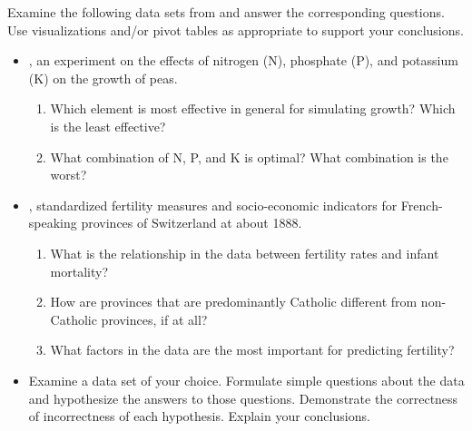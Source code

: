 \begin{problem} %
Examine the following data sets from  and answer the corresponding questions.
Use visualizations and/or pivot tables as appropriate to support your conclusions.
\begin{itemize}
    \item {}, an experiment on the effects of nitrogen (N), phosphate (P), and potassium (K) on the growth of peas.
    \begin{enumerate}
        \item Which element is most effective in general for simulating growth?
        Which is the least effective?
        \item What combination of N, P, and K is optimal? What combination is the worst?
    \end{enumerate}
    \item {}, standardized fertility measures and socio-economic indicators for French-speaking provinces of Switzerland at about 1888.
    \begin{enumerate}
        \item What is the relationship in the data between fertility rates and infant mortality?
        \item How are provinces that are predominantly Catholic different from non-Catholic provinces, if at all?
        \item What factors in the data are the most important for predicting fertility?
    \end{enumerate}
    \item Examine a data set of your choice.
    Formulate simple questions about the data and hypothesize the answers to those questions.
    Demonstrate the correctness of incorrectness of each hypothesis.
    Explain your conclusions.
\end{itemize}
\end{problem}
